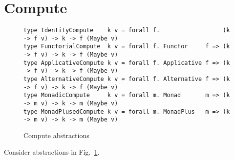 \section{Compute}\label{sec-compute}

\begin{figure}
\begin{verbatim}
type IdentityCompute    k v = forall f.                  (k -> f v) -> k -> f (Maybe v)
type FunctorialCompute  k v = forall f. Functor     f => (k -> f v) -> k -> f (Maybe v)
type ApplicativeCompute k v = forall f. Applicative f => (k -> f v) -> k -> f (Maybe v)
type AlternativeCompute k v = forall f. Alternative f => (k -> f v) -> k -> f (Maybe v)
type MonadicCompute     k v = forall m. Monad       m => (k -> m v) -> k -> m (Maybe v)
type MonadPlusedCompute k v = forall m. MonadPlus   m => (k -> m v) -> k -> m (Maybe v)
\end{verbatim}
\caption{Compute abstractions}\label{fig-compute}
\end{figure}

Consider abstractions in Fig.~\ref{fig-compute}.

